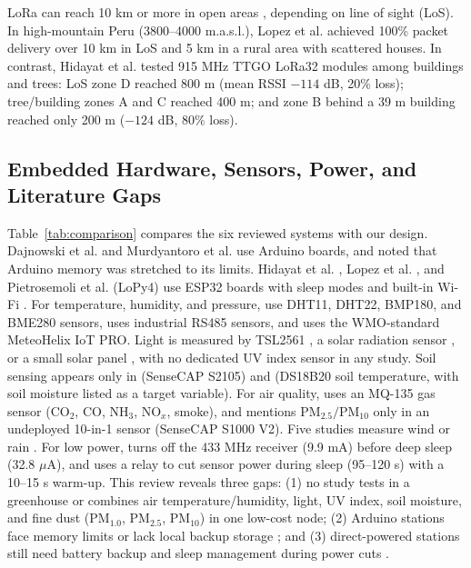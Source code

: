 \documentclass[conference,onecolumn]{IEEEtran}
\begin{document}
LoRa can reach 10 km or more in open areas \cite{dajnowski2024, murdyantoro2019}, depending on line of sight (LoS). In high-mountain Peru (3800--4000 m.a.s.l.), Lopez et al. \cite{lopez2025} achieved 100\% packet delivery over 10 km in LoS and 5 km in a rural area with scattered houses. In contrast, Hidayat et al. \cite{hidayat2019} tested 915 MHz TTGO LoRa32 modules among buildings and trees: LoS zone D reached 800 m (mean RSSI $-114$ dB, 20\% loss); tree/building zones A and C reached 400 m; and zone B behind a 39 m building reached only 200 m ($-124$ dB, 80\% loss).

\subsection{Embedded Hardware, Sensors, Power, and Literature Gaps}
Table~\ref{tab:comparison} compares the six reviewed systems with our design. Dajnowski et al. \cite{dajnowski2024} and Murdyantoro et al. \cite{murdyantoro2019} use Arduino boards, and \cite{dajnowski2024} noted that Arduino memory was stretched to its limits. Hidayat et al. \cite{hidayat2019}, Lopez et al. \cite{lopez2025}, and Pietrosemoli et al. (LoPy4) \cite{pietrosemoli2019} use ESP32 boards with sleep modes and built-in Wi-Fi \cite{hidayat2019, lopez2025}. For temperature, humidity, and pressure, \cite{dajnowski2024, hidayat2019, pietrosemoli2019, murdyantoro2019} use DHT11, DHT22, BMP180, and BME280 sensors, \cite{lopez2025} uses industrial RS485 sensors, and \cite{zennaro2025} uses the WMO-standard MeteoHelix IoT PRO. Light is measured by TSL2561 \cite{hidayat2019}, a solar radiation sensor \cite{lopez2025}, or a small solar panel \cite{zennaro2025}, with no dedicated UV index sensor in any study. Soil sensing appears only in \cite{zennaro2025} (SenseCAP S2105) and \cite{lopez2025} (DS18B20 soil temperature, with soil moisture listed as a target variable). For air quality, \cite{dajnowski2024} uses an MQ-135 gas sensor ($\text{CO}_2$, CO, $\text{NH}_3$, $\text{NO}_x$, smoke), and \cite{zennaro2025} mentions $\text{PM}_{2.5}/\text{PM}_{10}$ only in an undeployed 10-in-1 sensor (SenseCAP S1000 V2). Five studies measure wind or rain \cite{dajnowski2024, zennaro2025, lopez2025, pietrosemoli2019, murdyantoro2019}. For low power, \cite{pietrosemoli2019} turns off the 433 MHz receiver (9.9 mA) before deep sleep (32.8 $\mu$A), and \cite{lopez2025} uses a relay to cut sensor power during sleep (95--120 s) with a 10--15 s warm-up. This review reveals three gaps: (1) no study tests in a greenhouse or combines air temperature/humidity, light, UV index, soil moisture, and fine dust ($\text{PM}_{1.0}$, $\text{PM}_{2.5}$, $\text{PM}_{10}$) in one low-cost node; (2) Arduino stations face memory limits \cite{dajnowski2024} or lack local backup storage \cite{murdyantoro2019}; and (3) direct-powered stations still need battery backup and sleep management during power cuts \cite{zennaro2025}.
\end{document}

